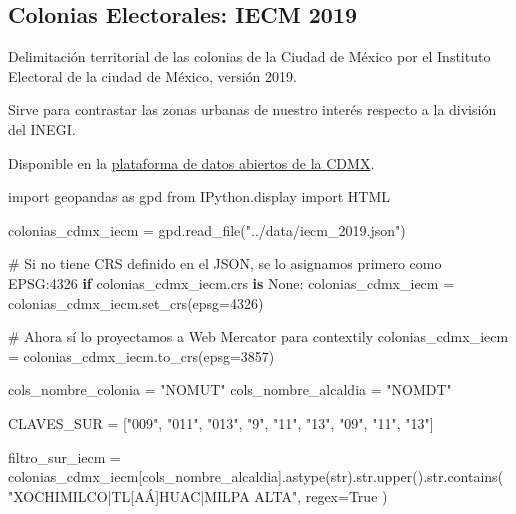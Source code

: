 \documentclass[
  spanish,
  letterpaper,
  DIV=11,
  numbers=noendperiod]{scrartcl}
\newenvironment{Shaded}{\begin{snugshade}}{\end{snugshade}}
\newcommand{\BuiltInTok}[1]{\textcolor[rgb]{0.00,0.23,0.31}{#1}}
\newcommand{\CommentTok}[1]{\textcolor[rgb]{0.37,0.37,0.37}{#1}}
\newcommand{\ControlFlowTok}[1]{\textcolor[rgb]{0.00,0.23,0.31}{\textbf{#1}}}
\newcommand{\DecValTok}[1]{\textcolor[rgb]{0.68,0.00,0.00}{#1}}
\newcommand{\ImportTok}[1]{\textcolor[rgb]{0.00,0.46,0.62}{#1}}
\newcommand{\KeywordTok}[1]{\textcolor[rgb]{0.00,0.23,0.31}{\textbf{#1}}}
\newcommand{\NormalTok}[1]{\textcolor[rgb]{0.00,0.23,0.31}{#1}}
\newcommand{\OperatorTok}[1]{\textcolor[rgb]{0.37,0.37,0.37}{#1}}
\newcommand{\StringTok}[1]{\textcolor[rgb]{0.13,0.47,0.30}{#1}}
\newcommand{\VariableTok}[1]{\textcolor[rgb]{0.07,0.07,0.07}{#1}}
\begin{document}
\subsection{Colonias Electorales: IECM
2019}\label{colonias-electorales-iecm-2019}

Delimitación territorial de las colonias de la Ciudad de México por el
Instituto Electoral de la ciudad de México, versión 2019.

Sirve para contrastar las zonas urbanas de nuestro interés respecto a la
división del INEGI.

Disponible en la
\href{https://datos.cdmx.gob.mx/dataset/coloniascdmx}{plataforma de
datos abiertos de la CDMX}.

\begin{Shaded}
\begin{Highlighting}[]
\ImportTok{import}\NormalTok{ geopandas }\ImportTok{as}\NormalTok{ gpd}
\ImportTok{from}\NormalTok{ IPython.display }\ImportTok{import}\NormalTok{ HTML}

\NormalTok{colonias\_cdmx\_iecm }\OperatorTok{=}\NormalTok{ gpd.read\_file(}\StringTok{"../data/iecm\_2019.json"}\NormalTok{)}

\CommentTok{\# Si no tiene CRS definido en el JSON, se lo asignamos primero como EPSG:4326}
\ControlFlowTok{if}\NormalTok{ colonias\_cdmx\_iecm.crs }\KeywordTok{is} \VariableTok{None}\NormalTok{:}
\NormalTok{    colonias\_cdmx\_iecm }\OperatorTok{=}\NormalTok{ colonias\_cdmx\_iecm.set\_crs(epsg}\OperatorTok{=}\DecValTok{4326}\NormalTok{)}

\CommentTok{\# Ahora sí lo proyectamos a Web Mercator para contextily}
\NormalTok{colonias\_cdmx\_iecm }\OperatorTok{=}\NormalTok{ colonias\_cdmx\_iecm.to\_crs(epsg}\OperatorTok{=}\DecValTok{3857}\NormalTok{)}

\NormalTok{cols\_nombre\_colonia }\OperatorTok{=} \StringTok{"NOMUT"}
\NormalTok{cols\_nombre\_alcaldia }\OperatorTok{=} \StringTok{"NOMDT"}

\NormalTok{CLAVES\_SUR }\OperatorTok{=}\NormalTok{ [}\StringTok{"009"}\NormalTok{, }\StringTok{"011"}\NormalTok{, }\StringTok{"013"}\NormalTok{, }\StringTok{"9"}\NormalTok{, }\StringTok{"11"}\NormalTok{, }\StringTok{"13"}\NormalTok{, }\StringTok{"09"}\NormalTok{, }\StringTok{"11"}\NormalTok{, }\StringTok{"13"}\NormalTok{]}


\NormalTok{filtro\_sur\_iecm }\OperatorTok{=}\NormalTok{ colonias\_cdmx\_iecm[cols\_nombre\_alcaldia].astype(}\BuiltInTok{str}\NormalTok{).}\BuiltInTok{str}\NormalTok{.upper().}\BuiltInTok{str}\NormalTok{.contains(}
    \StringTok{"XOCHIMILCO|TL[AÁ]HUAC|MILPA ALTA"}\NormalTok{, regex}\OperatorTok{=}\VariableTok{True}
\NormalTok{)}


\end{Highlighting}
\end{Shaded}
\end{document}
